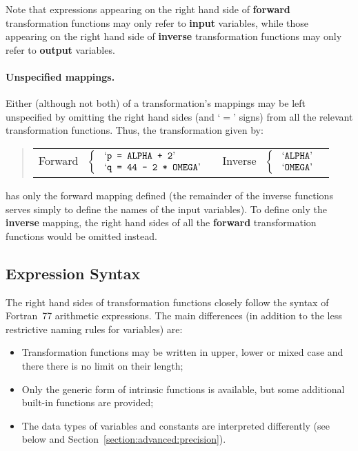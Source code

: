 \documentclass[twoside,11pt]{article}
\newcommand{\xlabel}[1]{}
\begin{document}
Note that expressions appearing on the right hand side of \textbf{forward}
transformation functions may only refer to \textbf{input} variables, while
those appearing on the right hand side of \textbf{inverse} transformation
functions may only refer to \textbf{output} variables. 

\paragraph{Unspecified mappings.}
Either (although not both) of a transformation's mappings may be left
unspecified by omitting the right hand sides (and `$=$' signs) from all the
relevant transformation functions. 
Thus, the transformation given by:

\begin{quote}
\begin{center}
\begin{tabular}{cc}

\mbox{Forward } $\left\{ \mbox{
\begin{tabular}{l}
`\texttt{p = ALPHA + 2}' \\
`\texttt{q = 44 - 2 * OMEGA}' \\
\end{tabular}
}\right.$
&
\mbox{Inverse } $\left\{ \mbox{
\begin{tabular}{l}
`\texttt{ALPHA}' \\
`\texttt{OMEGA}'
\end{tabular}
}\right.$

\end{tabular}
\end{center}
\end{quote}

has only the forward mapping defined (the remainder of the inverse functions
serves simply to define the names of the input variables). 
To define only the \textbf{inverse} mapping, the right hand sides of all the
\textbf{forward} transformation functions would be omitted instead. 


\subsection{\xlabel{expression_syntax}Expression Syntax}

The right hand sides of transformation functions closely follow the syntax
of Fortran~77 arithmetic expressions. 
The main differences (in addition to the less restrictive naming rules for
variables) are:

\begin{itemize}

\item Transformation functions may be written in upper, lower or mixed case 
and there there is no limit on their length;

\item Only the generic form of intrinsic functions is available, but some
additional built-in functions are provided;

\item The data types of variables and constants are interpreted differently
(see below and Section~\ref{section:advanced:precision}).

\end{itemize}
\end{document}

